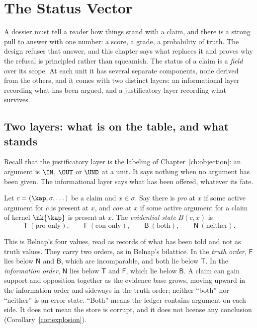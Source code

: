 \chapter{The Status Vector}\label{ch:status}

A dossier must tell a reader how things stand with a claim, and there is a strong pull to answer with one number: a score, a grade, a probability of truth. The design refuses that answer, and this chapter says what replaces it and proves why the refusal is principled rather than squeamish. The status of a claim is a \emph{field} over its scope. At each unit it has several separate components, none derived from the others, and it comes with two distinct layers: an informational layer recording what has been argued, and a justificatory layer recording what survives.

\section{Two layers: what is on the table, and what stands}

Recall that the justificatory layer is the labeling of Chapter~\ref{ch:objection}: an argument is $\IN$, $\OUT$ or $\UND$ at a unit. It says nothing when no argument has been given. The informational layer says what has been offered, whatever its fate.

\begin{definition}\label{def:evstate}
Let $c=(\kap,\sigma,\dots)$ be a claim and $x\in\sigma$. Say there is \emph{pro} at $x$ if some active argument for $c$ is present at $x$, and \emph{con} at $x$ if some active argument for a claim of kernel $\nk{\kap}$ is present at $x$. The \emph{evidential state} $B(c,x)$ is
\[
\mathsf T\ (\text{pro only}),\qquad\mathsf F\ (\text{con only}),\qquad\mathsf B\ (\text{both}),\qquad\mathsf N\ (\text{neither}).
\]
\end{definition}

This is Belnap's four values, read as records of what has been told and not as truth values. They carry two orders, as in Belnap's bilattice. In the \emph{truth order}, $\mathsf F$ lies below $\mathsf N$ and $\mathsf B$, which are incomparable, and both lie below $\mathsf T$. In the \emph{information order}, $\mathsf N$ lies below $\mathsf T$ and $\mathsf F$, which lie below $\mathsf B$. A claim can gain support and opposition together as the evidence base grows, moving upward in the information order and sideways in the truth order; neither ``both'' nor ``neither'' is an error state. ``Both'' means the ledger contains argument on each side. It does not mean the store is corrupt, and it does not license any conclusion (Corollary~\ref{cor:explosion}).

